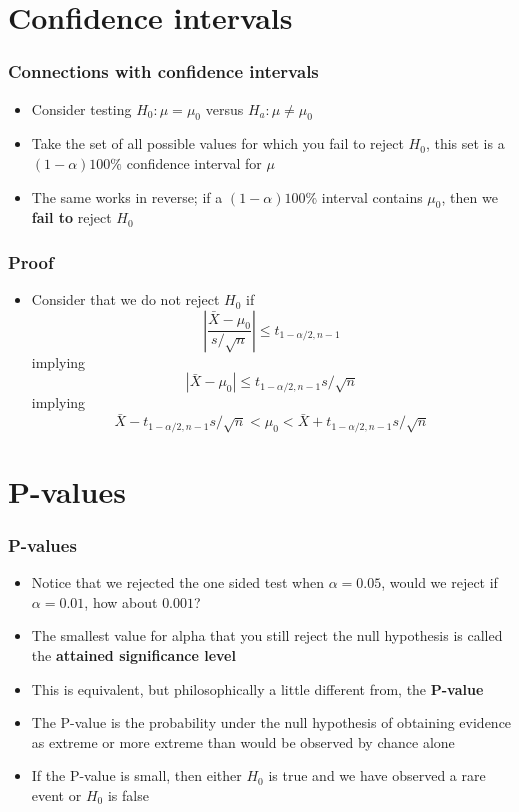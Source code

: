 \documentclass{beamer}
\begin{document}
\section{Confidence intervals}
\begin{frame}\frametitle{Connections with confidence intervals}
\begin{itemize}
\item Consider testing $H_0: \mu = \mu_0$ versus $H_a: \mu \neq \mu_0$
\item Take the set of all possible values for which you fail to reject $H_0$, this
  set is a $(1-\alpha)100\%$ confidence interval for $\mu$
\item The same works in reverse; if a $(1-\alpha)100\%$ interval
  contains $\mu_0$, then we {\bf fail  to} reject $H_0$
\end{itemize}
\end{frame}

\begin{frame}\frametitle{Proof}
\begin{itemize}
\item Consider that we do not reject $H_0$ if
  $$\left| \frac{\bar X - \mu_0}{s /\sqrt{n}} \right| \leq t_{1-\alpha/2, n-1}$$
implying
  $$
  \left|\bar X - \mu_0 \right| \leq t_{1-\alpha/2, n-1} s /\sqrt{n}
  $$
implying
  $$
  \bar X - t_{1-\alpha/2, n-1} s /\sqrt{n} < \mu_0 
  < \bar X + t_{1-\alpha/2, n-1} s /\sqrt{n} 
  $$
\end{itemize}
\end{frame}

\section{P-values}
\begin{frame}\frametitle{P-values}
\begin{itemize}
\item Notice that we rejected the one sided test when $\alpha = 0.05$, would we reject
  if $\alpha = 0.01$, how about $0.001$?
\item The smallest value for alpha that you still reject the null hypothesis is called the {\bf attained significance level}
\item This is equivalent, but philosophically a little different from, the {\bf P-value}
\item The P-value is the probability under the null hypothesis of
  obtaining evidence as extreme or more extreme than would be observed
  by chance alone
\item If the P-value is small, then either $H_0$ is true and we have
  observed a rare event or $H_0$ is false
\end{itemize}
\end{frame} 
\end{document}
